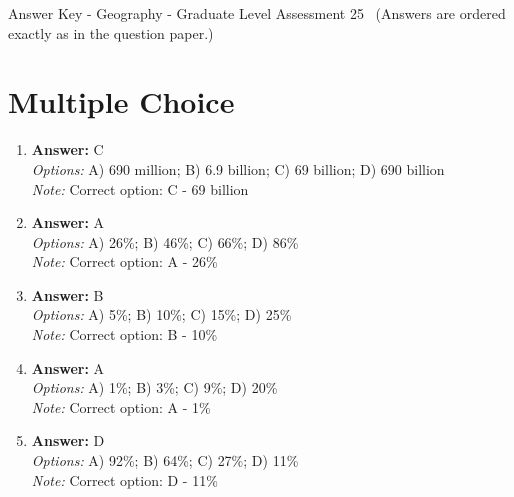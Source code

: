 \documentclass[12pt]{article}
\begin{document}
\begin{center}
Answer Key - Geography - Graduate Level Assessment 25 \
\small (Answers are ordered exactly as in the question paper.)
\end{center}

\section*{Multiple Choice}
\begin{enumerate}[label=\arabic*.]
\item \textbf{Answer:} C
\\ \textit{Options:} A) 690 million; B) 6.9 billion; C) 69 billion; D) 690 billion
\\ \textit{Note:} Correct option: C - 69 billion
\item \textbf{Answer:} A
\\ \textit{Options:} A) 26\%; B) 46\%; C) 66\%; D) 86\%
\\ \textit{Note:} Correct option: A - 26\%
\item \textbf{Answer:} B
\\ \textit{Options:} A) 5\%; B) 10\%; C) 15\%; D) 25\%
\\ \textit{Note:} Correct option: B - 10\%
\item \textbf{Answer:} A
\\ \textit{Options:} A) 1\%; B) 3\%; C) 9\%; D) 20\%
\\ \textit{Note:} Correct option: A - 1\%
\item \textbf{Answer:} D
\\ \textit{Options:} A) 92\%; B) 64\%; C) 27\%; D) 11\%
\\ \textit{Note:} Correct option: D - 11\%
\end{enumerate}
\end{document}
